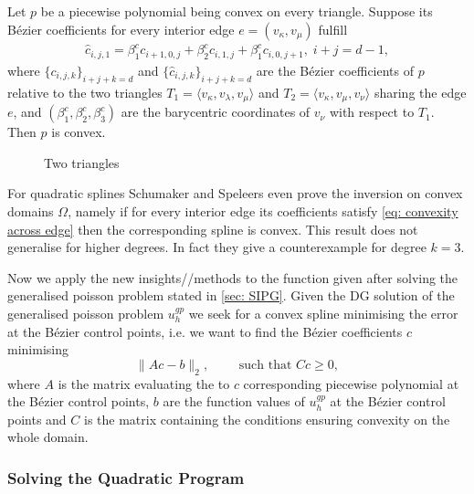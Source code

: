 \begin{theorem}
	Let $p$ be a piecewise polynomial being convex on every triangle. Suppose its B\'ezier coefficients for every interior edge $e =(v_\kappa, v_\mu)$ fulfill 
	\begin{align}
		{\hat c_{i,j,1}} = \beta_1^c c_{i+1, 0,j} +\beta_2^c c_{i,1,j} + \beta_1^c c_{i, 0,j+1}, \; i+j=d-1, \label{eq: convexity across edge}
	\end{align}
where  $\{c_{i,j,k}\}_{i+j+k=d}$ and $\{ {\hat c_{i,j,k}}\}_{i+j+k=d}$ are the B\'ezier coefficients of $p$ relative to the two triangles $T_1 = \langle v_\kappa, v_\lambda, v_\mu \rangle$ and $T_2 = \langle v_\kappa, v_\mu, v_\nu \rangle$ sharing the edge $e$, and $(\beta_1^c,\beta_2^c,\beta_3^c)$ are the barycentric coordinates of $v_\nu$ with respect to $T_1$. Then $p$ is convex.
\end{theorem}

\begin{figure}[h]
	
	\caption{Two triangles}
\end{figure}

For quadratic splines Schumaker and Speleers even prove the inversion on convex domains $\Omega$, namely if for every interior edge its coefficients satisfy \eqref{eq: convexity across edge} then the corresponding spline is convex.
This result does not generalise for higher degrees. In fact they give a counterexample for degree $k = 3$.

Now we apply the new insights//methods to the function given after solving the generalised poisson problem stated in \ref{sec: SIPG}.
Given the DG solution of the generalised poisson problem $u^{gp}_h$ we seek for a convex spline minimising the error at the B\'ezier control points, i.e. we want to find the B\'ezier coefficients $c$ minimising
\[
		\lVert A c - b \rVert_2, \qquad \text{ such that } Cc \geq 0,
\]
where $A$ is the matrix evaluating the to $c$ corresponding piecewise polynomial at the B\'ezier control points, $b$ are the function values of $u^{gp}_h$ at the B\'ezier control points and $C$ is the matrix containing the conditions ensuring convexity on the whole domain.

\subsubsection{Solving the Quadratic Program}

